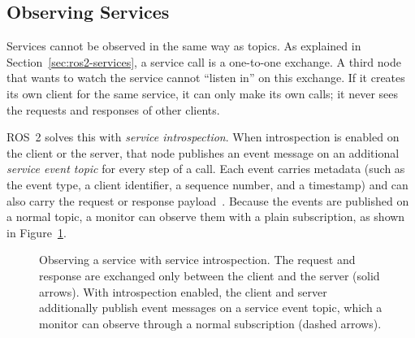 \subsection{Observing Services}\label{sec:observing-services}

Services cannot be observed in the same way as topics. As explained in
Section~\ref{sec:ros2-services}, a service call is a one-to-one exchange. A
third node that wants to watch the service cannot ``listen in'' on this
exchange. If it creates its own client for the same service, it can only make
its own calls; it never sees the requests and responses of other clients.

ROS~2 solves this with \emph{service introspection}. When introspection is
enabled on the client or the server, that node publishes an event message on
an additional \emph{service event topic} for every step of a call. Each event
carries metadata (such as the event type, a client identifier, a sequence
number, and a timestamp) and can also carry the request or response
payload~\cite{ros2serviceintrospection}. Because the events are published on a
normal topic, a monitor can observe them with a plain subscription, as shown
in Figure~\ref{fig:service-introspection}.

\begin{figure}[htbp]
\centering
{}
\caption{Observing a service with service introspection. The request and
response are exchanged only between the client and the server (solid arrows).
With introspection enabled, the client and server additionally publish event
messages on a service event topic, which a monitor can observe through a
normal subscription (dashed arrows).}
\label{fig:service-introspection}
\end{figure}

